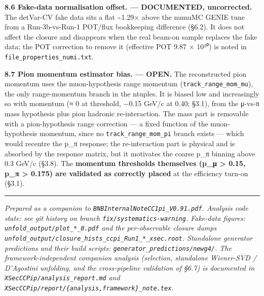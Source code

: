 \documentclass[11pt]{article}
\begin{document}
\textbf{8.6 Fake-data normalisation offset. — DOCUMENTED, uncorrected.} The detVar-CV fake data sits a flat \textasciitilde{}1.29× above the numuMC GENIE tune from a Run-3b-vs-Run-1 POT/flux bookkeeping difference (§6.2). It does not affect the closure and disappears when the real beam-on sample replaces the fake data; the POT correction to remove it (effective POT 9.87 × 10²⁰) is noted in \texttt{file\_properties\_numi.txt}.

\textbf{8.7 Pion momentum estimator bias. — OPEN.} The reconstructed pion momentum uses the muon-hypothesis range momentum (\texttt{track\_range\_mom\_mu}), the only range-momentum branch in the ntuples. It is biased low and increasingly so with momentum (≈ 0 at threshold, −0.15 GeV/c at 0.40; §3.1), from the μ-vs-π mass hypothesis plus pion hadronic re-interaction. The mass part is removable with a pion-hypothesis range correction — a fixed function of the muon-hypothesis momentum, since no \texttt{track\_range\_mom\_pi} branch exists — which would recentre the p\_π response; the re-interaction part is physical and is absorbed by the response matrix, but it motivates the coarse p\_π binning above 0.3 GeV/c (§3.8). The \textbf{momentum thresholds themselves (p\_μ > 0.15, p\_π > 0.175) are validated as correctly placed} at the efficiency turn-on (§3.1).

\vspace{0.5em}\hrule\vspace{0.5em}

\emph{Prepared as a companion to \texttt{BNBInternalNoteCC1pi\_V0.91.pdf}. Analysis code state: see git history on branch \texttt{fix/systematics-warning}. Fake-data figures: \texttt{unfold\_output/plot\_*\_0.pdf} and the per-observable closure dumps \texttt{unfold\_output/closure\_hists\_ccpi\_Run1\_*\_xsec.root}. Standalone generator predictions and their build scripts: \texttt{generator\_predictions/newg4/}. The framework-independent companion analysis (selection, standalone Wiener-SVD / D'Agostini unfolding, and the cross-pipeline validation of §6.7) is documented in \texttt{XSecCCPip/analysis\_report.md} and \texttt{XSecCCPip/report/\{analysis,framework\}\_note.tex}.}
\end{document}
